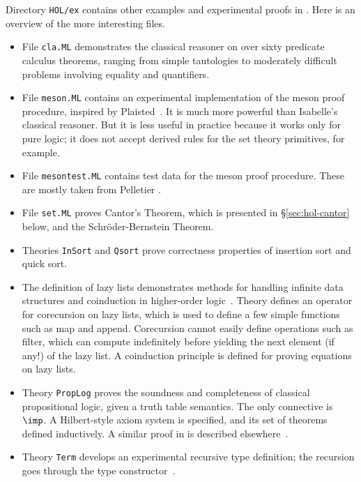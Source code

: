 Directory {\tt HOL/ex} contains other examples and experimental proofs in
{\HOL}.  Here is an overview of the more interesting files.
\begin{itemize}
\item File {\tt cla.ML} demonstrates the classical reasoner on over sixty
  predicate calculus theorems, ranging from simple tautologies to
  moderately difficult problems involving equality and quantifiers.

\item File {\tt meson.ML} contains an experimental implementation of the {\sc
    meson} proof procedure, inspired by Plaisted~\cite{plaisted90}.  It is
  much more powerful than Isabelle's classical reasoner.  But it is less
  useful in practice because it works only for pure logic; it does not
  accept derived rules for the set theory primitives, for example.

\item File {\tt mesontest.ML} contains test data for the {\sc meson} proof
  procedure.  These are mostly taken from Pelletier \cite{pelletier86}.

\item File {\tt set.ML} proves Cantor's Theorem, which is presented in
  \S\ref{sec:hol-cantor} below, and the Schr\"oder-Bernstein Theorem.

\item Theories {\tt InSort} and {\tt Qsort} prove correctness properties of
  insertion sort and quick sort.

\item The definition of lazy lists demonstrates methods for handling
  infinite data structures and coinduction in higher-order
  logic~\cite{paulson-coind}.  Theory  defines an operator for
  corecursion on lazy lists, which is used to define a few simple functions
  such as map and append.  Corecursion cannot easily define operations such
  as filter, which can compute indefinitely before yielding the next
  element (if any!) of the lazy list.  A coinduction principle is defined
  for proving equations on lazy lists.

\item Theory {\tt PropLog} proves the soundness and completeness of
  classical propositional logic, given a truth table semantics.  The only
  connective is $\imp$.  A Hilbert-style axiom system is specified, and its
  set of theorems defined inductively.  A similar proof in \ZF{} is
  described elsewhere~\cite{paulson-set-II}.

\item Theory {\tt Term} develops an experimental recursive type definition;
  the recursion goes through the type constructor~.


\end{itemize}
